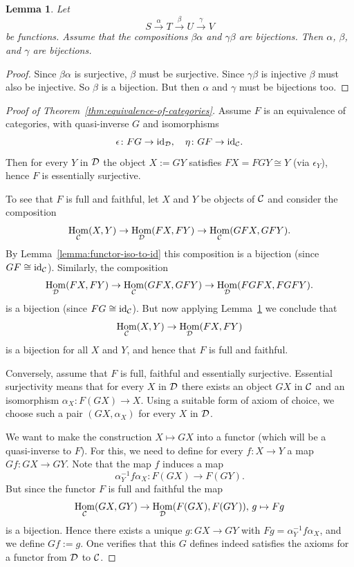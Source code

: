 \documentclass[11pt]{amsbook}
\newcommand{\longto}{\longrightarrow}
\DeclareMathOperator\Hom{Hom}
\def\id{{\rm id}}
\theoremstyle{plain}
\newtheorem{lemma}[theorem]{Lemma}
\theoremstyle{definition}
\begin{document}
\begin{lemma}\label{lemma:two-out-of-three}
Let 
\[
	S \overset\alpha\longto T \overset\beta\longto U \overset\gamma\longto V
\]
be functions. Assume that the compositions $\beta\alpha$ and $\gamma\beta$ are bijections. Then $\alpha$, $\beta$, and $\gamma$ are bijections.
\end{lemma}

\begin{proof}
Since $\beta\alpha$ is surjective, $\beta$ must be surjective. Since $\gamma\beta$ is injective $\beta$ must also be injective. So $\beta$ is a bijection. But then $\alpha$ and $\gamma$ must be bijections too.
\end{proof}



\begin{proof}[Proof of Theorem~\ref{thm:equivalence-of-categories}]
Assume $F$ is an equivalence of categories, with quasi-inverse $G$ and isomorphisms
\[
	\epsilon\colon FG \to \id_\cD,\quad \eta\colon GF\to \id_\cC.
\]
Then for every $Y$ in ${\mathcal{D}}$ the object $X := GY$ satisfies $FX = FGY \cong Y$ (via $\epsilon_Y$), hence $F$ is essentially surjective. 

To see that $F$ is full and faithful, let $X$ and $Y$ be objects of ${\mathcal{C}}$ and consider
the composition
\[
	\Hom_{\cC}(X,Y) \to \Hom_{\cD}(FX,FY) \to \Hom_{\cC}(GFX,GFY).
\]
By Lemma~\ref{lemma:functor-iso-to-id} this composition is a bijection (since $GF\cong \id_\cC$). Similarly, the composition
\[
	\Hom_{\cD}(FX,FY) \to \Hom_{\cC}(GFX,GFY) \to \Hom_{\cD}(FGFX,FGFY).
\]
is a bijection (since $FG\cong \id_{\cC}$). But now applying Lemma~\ref{lemma:two-out-of-three} we conclude that 
\[
	\Hom_{\cC}(X,Y) \to \Hom_{\cD}(FX,FY)
\]
is a bijection for all $X$ and $Y$, and hence that $F$ is full and faithful.



Conversely, assume that $F$ is full, faithful and essentially surjective. Essential surjectivity means that for every $X$ in ${\mathcal{D}}$ there exists an object $GX$ in ${\mathcal{C}}$ and an isomorphism $\alpha_{X}\colon F(GX) \to X$. Using a suitable form of axiom of choice, we choose such a pair $(GX, \alpha_X)$ for every $X$ in ${\mathcal{D}}$.

We want to make the construction $X \mapsto GX$ into a functor (which will be a quasi-inverse to $F$). For this, we need to define for every $f\colon X\to Y$  a map $Gf\colon GX \to GY$. Note that the map $f$ induces a map
\[
	 \alpha_Y^{-1} f\alpha_X \colon F(GX) \to F(GY).
\]
But since the functor $F$ is full and faithful the map
\[
	\Hom_{\cC}(GX,GY) \to \Hom_\cD(F(GX),F(GY)),\, g \mapsto Fg
\]
is a bijection. Hence there exists a unique $g \colon GX \to GY$ with $Fg = \alpha_Y^{-1} f \alpha_X$, and we define $Gf := g$. One verifies that this $G$ defines indeed satisfies the axioms for a functor from ${\mathcal{D}}$ to ${\mathcal{C}}$.


\end{proof}
\end{document}
